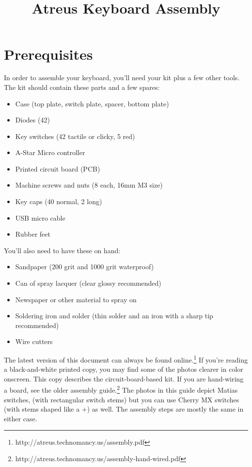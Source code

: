 \documentclass{article}
\title{Atreus Keyboard Assembly}
\date{ }
\begin{document}
\setlength{\parindent}{0cm}
\maketitle
\section{Prerequisites}

In order to assemble your keyboard, you'll need your kit plus a few
other tools. The kit should contain these parts and a few spares:

\begin{itemize}
\item Case (top plate, switch plate, spacer, bottom plate)
\item Diodes (42)
\item Key switches (42 tactile or clicky, 5 red)
\item A-Star Micro controller
\item Printed circuit board (PCB)
\item Machine screws and nuts (8 each, 16mm M3 size)
\item Key caps (40 normal, 2 long)
\item USB micro cable
\item Rubber feet
\end{itemize}

You'll also need to have these on hand:

\begin{itemize}
\item Sandpaper (200 grit and 1000 grit waterproof)
\item Can of spray lacquer (clear glossy recommended)
\item Newspaper or other material to spray on
\item Soldering iron and solder (thin solder and an iron with a sharp
  tip recommended)
\item Wire cutters
\end{itemize}

\vspace{1em}

The latest version of this document can always be found
online.\footnote{http://atreus.technomancy.us/assembly.pdf} If you're
reading a black-and-white printed copy, you may find some of the
photos clearer in color onscreen. This copy describes the
circuit-board-based kit. If you are hand-wiring a board, see the older
assembly
guide.\footnote{http://atreus.technomancy.us/assembly-hand-wired.pdf}
The photos in this guide depict Matias switches, (with rectangular
switch stems) but you can use Cherry MX switches (with stems shaped
like a +) as well. The assembly steps are mostly the same in either case.
\end{document}
